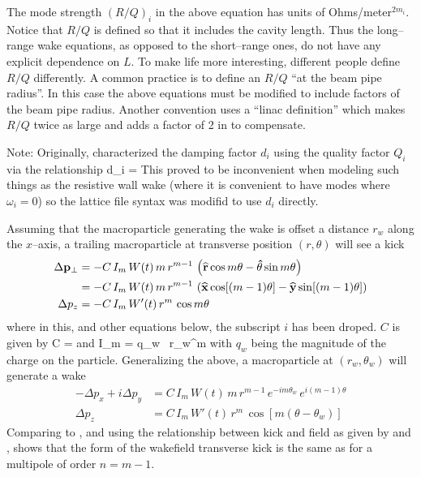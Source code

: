 The mode strength $(R/Q)_i$ in the above equation has units of Ohms/meter$^{2m_i}$. Notice that
$R/Q$ is defined so that it includes the cavity length. Thus the long--range wake equations, as
opposed to the short--range ones, do not have any explicit dependence on $L$. To make life more
interesting, different people define $R/Q$ differently. A common practice is to define an $R/Q$ ``at
the beam pipe radius''. In this case the above equations must be modified to include factors of the
beam pipe radius. Another convention uses a ``linac definition'' which makes $R/Q$ twice as large
and adds a factor of 2 in  to compensate.

Note: Originally, \bmad characterized the damping factor $d_i$ using the quality factor $Q_i$ via the
relationship
\Begineq
  d_i = 
  \label{do2q}
\Endeq
This proved to be inconvenient when modeling such things as the resistive wall wake (where it is convenient
to have modes where $\omega_i = 0$) so the lattice file syntax was modifid to use $d_i$ directly.

Assuming that the macroparticle generating the wake is offset a distance $r_w$ along the $x$--axis,
a trailing macroparticle at transverse position $(r, \theta)$ will see a kick
\begin{align}
  \Delta {{\bf p}}_\perp &= 
    -C \, I_m \, W(t) \, m \, r^{m-1} \, \left( 
    {\widehat{\bf r}} \cos m\theta - {\bf\hat\theta} \sin m\theta \right) \\
  &= -C \, I_m \, W(t) \, m \, r^{m-1} \, \left( {\widehat{\bf x}} \cos [(m-1) \theta] - 
    {\widehat{\bf y}} \sin [(m-1)\theta] \right) \nonumber \\
  \Delta p_z &= -C \, I_m \, W'(t) \, r^m \, \cos m\theta
\end{align}
where in this, and other equations below, the subscript $i$ has been droped. $C$ is given by
\Begineq
  C = 
\Endeq
 and
\Begineq
  I_m = q_w \, r_w^m
\Endeq
with $q_w$ being the magnitude of the charge on the particle.  Generalizing the above, a
macroparticle at $(r_w, \theta_w)$ will generate a wake
\begin{align}
  -\Delta p_x + i\Delta p_y &= C \, I_m \, W(t) \, 
    m \, r^{m-1} \, e^{-i m \theta_w} \, e^{i (m-1) \theta} 
    \label{ppcimr} \\
  \Delta p_z &= C \, I_m \, W'(t) \, r^m \, \cos [m(\theta - \theta_w)]
    \label{pciwr}
\end{align}
Comparing  to , and using the relationship between kick and field as given by
 and , shows that the form of the wakefield transverse kick is the same as
for a multipole of order $n = m - 1$.

